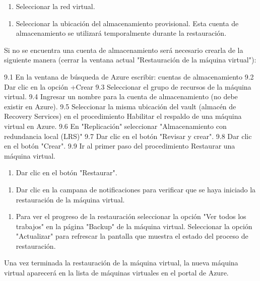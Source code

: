 \begin{enumerate}
\item Seleccionar la red virtual.
\end{enumerate}

\begin{enumerate}
\item Seleccionar la ubicación del almacenamiento provisional. Esta cuenta de almacenamiento se utilizará temporalmente durante la restauración.
\end{enumerate}

Si no se encuentra una cuenta de almacenamiento será necesario crearla de la siguiente manera (cerrar la ventana actual "Restauración de la máquina virtual"):

9.1 En la ventana de búsqueda de Azure escribir: cuentas de almacenamiento 9.2 Dar clic en la opción +Crear 9.3 Seleccionar el grupo de recursos de la máquina virtual. 9.4 Ingresar un nombre para la cuenta de almacenamiento (no debe existir en Azure). 9.5 Seleccionar la misma ubicación del vault (almacén de Recovery Services) en el procedimiento Habilitar el respaldo de una máquina virtual en Azure. 9.6 En "Replicación" seleccionar "Almacenamiento con redundancia local (LRS)" 9.7 Dar clic en el botón "Revisar y crear". 9.8 Dar clic en el botón "Crear". 9.9 Ir al primer paso del procedimiento Restaurar una máquina virtual.

\begin{enumerate}
\item Dar clic en el botón "Restaurar".
\end{enumerate}

\begin{enumerate}
\item Dar clic en la campana de notificaciones para verificar que se haya iniciado la restauración de la máquina virtual.
\end{enumerate}

\begin{enumerate}
\item Para ver el progreso de la restauración seleccionar la opción "Ver todos los trabajos" en la página "Backup" de la máquina virtual. Seleccionar la opción "Actualizar" para refrescar la pantalla que muestra el estado del proceso de restauración.
\end{enumerate}

Una vez terminada la restauración de la máquina virtual, la nueva máquina virtual aparecerá en la lista de máquinas virtuales en el portal de Azure.

